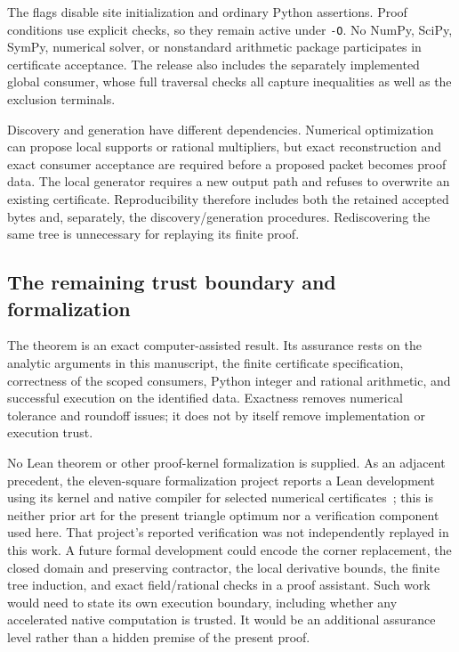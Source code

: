 \documentclass[11pt]{article}
\begin{document}
The flags disable site initialization and ordinary Python assertions. Proof conditions use explicit checks, so they remain active under \texttt{-O}. No NumPy, SciPy, SymPy, numerical solver, or nonstandard arithmetic package participates in certificate acceptance. The release also includes the separately implemented global consumer, whose full traversal checks all capture inequalities as well as the exclusion terminals.

Discovery and generation have different dependencies. Numerical optimization can propose local supports or rational multipliers, but exact reconstruction and exact consumer acceptance are required before a proposed packet becomes proof data. The local generator requires a new output path and refuses to overwrite an existing certificate. Reproducibility therefore includes both the retained accepted bytes and, separately, the discovery/generation procedures. Rediscovering the same tree is unnecessary for replaying its finite proof.

\subsection{The remaining trust boundary and formalization}

The theorem is an exact computer-assisted result. Its assurance rests on the analytic arguments in this manuscript, the finite certificate specification, correctness of the scoped consumers, Python integer and rational arithmetic, and successful execution on the identified data. Exactness removes numerical tolerance and roundoff issues; it does not by itself remove implementation or execution trust.

No Lean theorem or other proof-kernel formalization is supplied. As an adjacent precedent, the eleven-square formalization project reports a Lean development using its kernel and native compiler for selected numerical certificates~\cite{ElevenSquaresFormalized2026}; this is neither prior art for the present triangle optimum nor a verification component used here. That project's reported verification was not independently replayed in this work. A future formal development could encode the corner replacement, the closed domain and preserving contractor, the local derivative bounds, the finite tree induction, and exact field/rational checks in a proof assistant. Such work would need to state its own execution boundary, including whether any accelerated native computation is trusted. It would be an additional assurance level rather than a hidden premise of the present proof.
\end{document}
